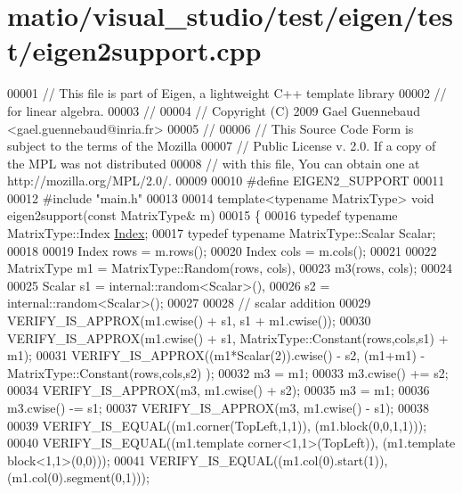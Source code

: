 \hypertarget{matio_2visual__studio_2test_2eigen_2test_2eigen2support_8cpp_source}{}\section{matio/visual\+\_\+studio/test/eigen/test/eigen2support.cpp}
\label{matio_2visual__studio_2test_2eigen_2test_2eigen2support_8cpp_source}

\begin{DoxyCode}
00001 \textcolor{comment}{// This file is part of Eigen, a lightweight C++ template library}
00002 \textcolor{comment}{// for linear algebra.}
00003 \textcolor{comment}{//}
00004 \textcolor{comment}{// Copyright (C) 2009 Gael Guennebaud <gael.guennebaud@inria.fr>}
00005 \textcolor{comment}{//}
00006 \textcolor{comment}{// This Source Code Form is subject to the terms of the Mozilla}
00007 \textcolor{comment}{// Public License v. 2.0. If a copy of the MPL was not distributed}
00008 \textcolor{comment}{// with this file, You can obtain one at http://mozilla.org/MPL/2.0/.}
00009 
00010 \textcolor{preprocessor}{#define EIGEN2\_SUPPORT}
00011 
00012 \textcolor{preprocessor}{#include "main.h"}
00013 
00014 \textcolor{keyword}{template}<\textcolor{keyword}{typename} MatrixType> \textcolor{keywordtype}{void} eigen2support(\textcolor{keyword}{const} MatrixType& m)
00015 \{
00016   \textcolor{keyword}{typedef} \textcolor{keyword}{typename} MatrixType::Index \hyperlink{namespace_eigen_a62e77e0933482dafde8fe197d9a2cfde}{Index};
00017   \textcolor{keyword}{typedef} \textcolor{keyword}{typename} MatrixType::Scalar Scalar;
00018 
00019   Index rows = m.rows();
00020   Index cols = m.cols();
00021 
00022   MatrixType m1 = MatrixType::Random(rows, cols),
00023              m3(rows, cols);
00024 
00025   Scalar  s1 = internal::random<Scalar>(),
00026           s2 = internal::random<Scalar>();
00027 
00028   \textcolor{comment}{// scalar addition}
00029   VERIFY\_IS\_APPROX(m1.cwise() + s1, s1 + m1.cwise());
00030   VERIFY\_IS\_APPROX(m1.cwise() + s1, MatrixType::Constant(rows,cols,s1) + m1);
00031   VERIFY\_IS\_APPROX((m1*Scalar(2)).cwise() - s2, (m1+m1) - MatrixType::Constant(rows,cols,s2) );
00032   m3 = m1;
00033   m3.cwise() += s2;
00034   VERIFY\_IS\_APPROX(m3, m1.cwise() + s2);
00035   m3 = m1;
00036   m3.cwise() -= s1;
00037   VERIFY\_IS\_APPROX(m3, m1.cwise() - s1);
00038 
00039   VERIFY\_IS\_EQUAL((m1.corner(TopLeft,1,1)), (m1.block(0,0,1,1)));
00040   VERIFY\_IS\_EQUAL((m1.template corner<1,1>(TopLeft)), (m1.template block<1,1>(0,0)));
00041   VERIFY\_IS\_EQUAL((m1.col(0).start(1)), (m1.col(0).segment(0,1)));

\end{DoxyCode}
